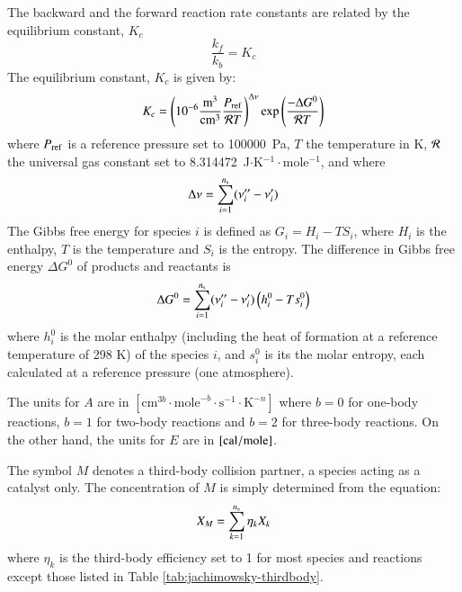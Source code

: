 \documentclass{warpdoc}
\newcommand{\ns}{{{n}_{\rm s}}}
\begin{document}
The backward and the forward reaction rate constants are related by the
equilibrium constant, $K_c$
%
\begin{equation}
\frac{k_f}{k_b} = K_c
\end{equation}
%
The equilibrium constant, $K_c$ is given by:
%
\begin{equation}
K_c = \left(10^{-6} \frac{\rm m^3}{\rm cm^3}\frac{P_{\rm ref}}{{\cal R} T}\right)^{\Delta \nu}
       \exp \left( \frac{-\Delta G^0}{{\cal R} T} \right)
\end{equation}
%
where $P_{\rm ref}$ is a reference pressure set to 100000~Pa, $T$ the temperature in K, $\cal R$ the universal gas constant set to 8.314472~J$\cdot$K$^{-1}\cdot$mole$^{-1}$,  and where
%
\begin{equation}
\Delta \nu = \sum_{i=1}^{\ns} (\nu''_i - \nu'_i)
\end{equation}
%
The Gibbs free energy for species $i$ is defined as $G_i = H_i - T S_i$, where $H_i$ is the enthalpy, $T$ is the temperature and $S_i$ is the entropy. The difference in Gibbs free energy $\Delta G^0$ of products and reactants is
%
\begin{equation}
\Delta G^0 = \sum_{i=1}^{\ns} (\nu''_i - \nu'_i) \left( h^0_i - T s^0_i \right)
\end{equation}
%
where $h^0_i$ is the molar enthalpy (including the heat of formation at a
reference temperature of 298 K)
of the species $i$, and $s^0_i$ is its the molar entropy,
each calculated at a reference pressure (one atmosphere).



The units for $A$ are in $[\textrm{cm}^{3b}\cdot \textrm{mole}^{-b} \cdot \textrm{s}^{-1} \cdot \textrm{K}^{-n} ]$ where $b=0$ for one-body reactions, $b=1$ for two-body reactions and $b=2$ for three-body reactions. On the other hand, the units for $E$ are in $[\rm {cal}/{mole}]$.

The symbol $M$ denotes a third-body collision partner, a species acting as a catalyst only.
The concentration of $M$ is simply determined from the equation:
%
\begin{equation}
X_M = \sum_{k=1}^{\ns} \eta_k X_k
\end{equation}
%
where $\eta_k$ is the third-body efficiency set to 1
for most species and reactions except those listed in Table 
\ref{tab:jachimowsky-thirdbody}.
\end{document}
